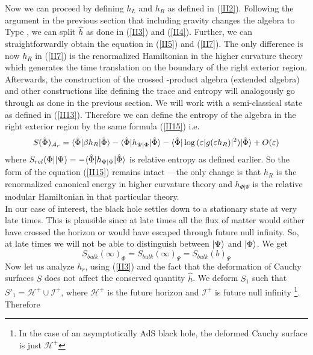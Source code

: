 \documentclass[12pt]{article}
\DeclarePairedDelimiter\bra{\langle}{\rvert}
\DeclarePairedDelimiter\ket{\lvert}{\rangle}
\newcommand{\RomanNumeralCaps}[1]
    {\MakeUppercase{\romannumeral #1}}
\begin{document}
Now we can proceed by defining $h_L$ and $h_R$ as defined in (\ref{II2}).  Following the argument in the previous section that including gravity changes the algebra to Type \RomanNumeralCaps {2}, we can split  $\hat{h}$ as done in (\ref{II3}) and (\ref{II4}). Further, we can straightforwardly obtain the equation in (\ref{II5}) and (\ref{II7}). The only difference is now $h_R$ in (\ref{II7}) is the renormalized Hamiltonian in the higher curvature theory which generates the time translation on the boundary of the right exterior region. Afterwards, the construction of the crossed -product algebra (extended algebra) and other constructions like defining the trace and entropy will analogously go through as done in the previous section. We will work with a semi-classical state as defined in (\ref{II13}). Therefore we can define the entropy of the algebra in the right exterior region by the same formula (\ref{II15}) i.e.
 \begin{equation}\label{III1}
 S(\hat{\Phi})_{\mathcal{A}_{r}}=\bra{\hat{\Phi}}\beta h_{R}\ket{\hat{\Phi}}-\bra{\hat{\Phi}}h_{\Psi|\Phi}\ket{\hat{\Phi}}-\bra{\hat{\Phi}} \log{(\varepsilon |g(\varepsilon h_R)|^2)}\ket{\hat{\Phi}} + O(\varepsilon)
 \end{equation}
where $S_{rel}(\Phi||\Psi)= -\bra{\hat{\Phi}}h_{\Psi|\Phi}\ket{\hat{\Phi}}$ is relative entropy as defined earlier. So the form of the equation (\ref{II15}) remains intact ---the only change is that $h_R$ is the renormalized canonical energy in higher curvature theory and $h_{\Phi|\Psi}$ is the relative modular Hamiltonian in that particular theory.
\\
In our case of interest, the black hole settles down to a stationary state at very late times. This is plausible since at late times all the flux of matter would either have crossed the horizon or would have escaped through future null infinity. So, at late times we will not be able to distinguish between $\ket{\Psi}$ and $\ket{\Phi}$. We get
\begin{equation}\label{II17}
S_{bulk}(\infty)_{\Phi}=S_{bulk}(\infty)_{\Psi}=S_{bulk}(b)_{\Psi}
\end{equation}
Now let us analyze $h_r$, using (\ref{II3}) and the fact that the deformation of Cauchy surfaces $S$ does not affect the conserved quantity $\hat{h}$. We deform $S_1$ such that $S'_1= \mathcal{H}^+ \cup \mathcal{I}^+$, where $\mathcal{H}^+$ is the future horizon and $\mathcal{I}^+$ is future null infinity \footnote{In the case of an asymptotically AdS black hole, the deformed Cauchy surface is just $\mathcal{H}^+$}. Therefore
\end{document}
